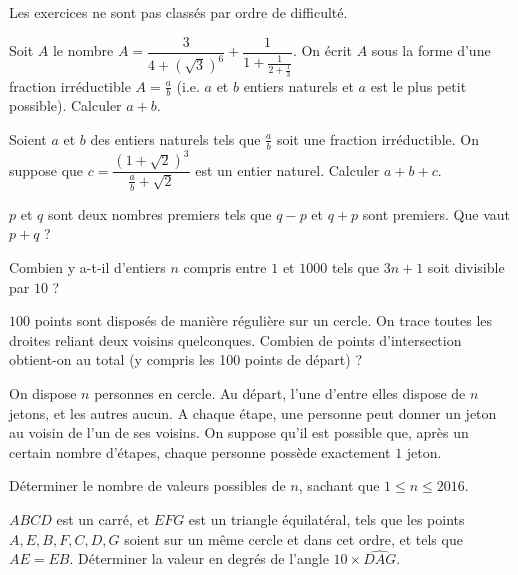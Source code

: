 Les exercices ne sont pas classés par ordre de difficulté.

\begin{exo}
Soit $A$ le nombre $A=\dfrac{3}{4+(\sqrt{3})^6}+\dfrac{1}{1+\frac{1}{2+\frac{1}{3}}}$. On écrit $A$ sous
la forme d'une fraction irréductible $A=\frac{a}{b}$ (i.e. $a$ et $b$ entiers naturels et $a$ est le plus petit possible). Calculer $a+b$. 
\end{exo}




\begin{exo}
 Soient $a$ et $b$ des entiers naturels tels que $\frac{a}{b}$ soit une fraction irréductible.
On suppose que $c=\dfrac{(1+\sqrt{2})^3}{\frac{a}{b}+\sqrt{2}}$ est un entier naturel. Calculer $a+b+c$.
\end{exo}





\begin{exo}
 $p$ et $q$ sont deux nombres premiers tels que $q-p$ et $q+p$ sont premiers. Que vaut $p+q$ ?
\end{exo}



\begin{exo}
 Combien y a-t-il d'entiers $n$ compris entre $1$ et $1000$ tels que $3n+1$ soit divisible par $10$ ?
\end{exo}



\begin{exo}
 $100$ points sont disposés de manière régulière sur un cercle. On trace toutes les droites
reliant deux voisins quelconques. Combien de points d'intersection obtient-on au total (y compris
les 100 points de départ) ?
\end{exo}



\begin{exo}
On dispose $n$ personnes en cercle. Au départ,
l'une d'entre elles dispose de $n$ jetons, et les autres aucun. A chaque étape, une personne peut donner un
jeton au voisin de l'un de ses voisins. On suppose qu'il est possible que, après un certain nombre d'étapes,
chaque personne possède exactement $1$ jeton.

Déterminer le nombre de valeurs possibles de $n$, sachant que $1\leqslant n\leqslant 2016$.
\end{exo}



\begin{exo}
 $ABCD$ est un carré, et $EFG$ est un triangle équilatéral, tels que les points $A,E,B,F,C,D,G$ soient sur un
même cercle et dans cet ordre, et tels que $AE=EB$. Déterminer la valeur en degrés de l'angle $10\times \widehat{DAG}$.
\end{exo}




